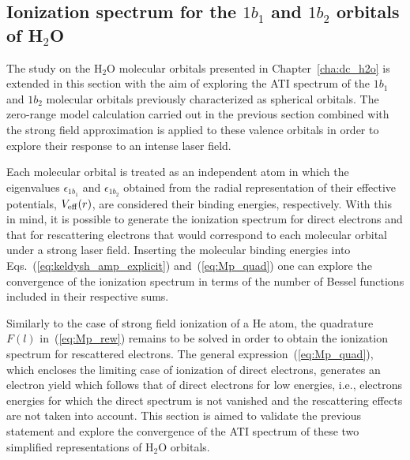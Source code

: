 \subsection{\label{sec:mo_sfa} Ionization spectrum for the $1b_{1}$ and $1b_{2}$ orbitals
  of H$_{2}$O}



The study on the H$_{2}$O molecular orbitals presented in
Chapter~\ref{cha:dc_h2o} is extended in this section with the aim of
exploring the ATI spectrum of the $1b_{1}$ and $1b_{2}$ molecular
orbitals previously characterized as spherical orbitals. The
zero-range model calculation carried out in the previous section
combined with the strong field approximation is applied to these
valence orbitals in order to explore their response to an intense
laser field.


Each molecular orbital is treated as an independent atom in which the
eigenvalues $\epsilon_{1b_{1}}$ and $\epsilon_{1b_{2}}$ obtained from
the radial representation of their effective potentials,
$V_{\rm{eff}}(r)$, are considered their binding energies,
respectively. With this in mind, it is possible to generate the
ionization spectrum for direct electrons and that for rescattering
electrons that would correspond to each molecular orbital under a
strong laser field. Inserting the molecular binding energies into
Eqs.~(\ref{eq:keldysh_amp_explicit}) and~(\ref{eq:Mp_quad}) one can
explore the convergence of the ionization spectrum in terms of the
number of Bessel functions included in their respective sums.

Similarly to the case of strong field ionization of a He atom, the
quadrature $F(l)$ in~(\ref{eq:Mp_rew}) remains to be solved in order
to obtain the ionization spectrum for rescattered electrons. The
general expression~(\ref{eq:Mp_quad}), which encloses the limiting
case of ionization of direct electrons, generates an electron yield
which follows that of direct electrons for low energies, i.e.,
electrons energies for which the direct spectrum is not vanished and
the rescattering effects are not taken into account. This section is
aimed to validate the previous statement and explore the convergence
of the ATI spectrum of these two simplified representations of
H$_{2}$O orbitals.

